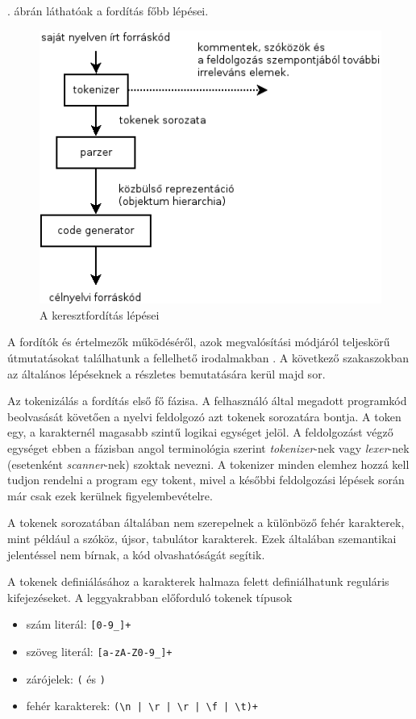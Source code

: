 . ábrán láthatóak a fordítás főbb lépései.
\begin{figure}
\centering
\includegraphics[scale=1]{kepek/process.png}
\caption{A keresztfordítás lépései}
\label{fig:process}
\end{figure}
A fordítók és értelmezők működéséről, azok megvalósítási módjáról teljeskörű útmutatásokat találhatunk a fellelhető irodalmakban \cite{compilers}.
A következő szakaszokban az általános lépéseknek a részletes bemutatására kerül majd sor.


Az tokenizálás a fordítás első fő fázisa. A felhasználó által megadott programkód beolvasását követően a nyelvi feldolgozó azt tokenek sorozatára bontja.
A token egy, a karakternél magasabb szintű logikai egységet jelöl.
A feldolgozást végző egységet ebben a fázisban angol terminológia szerint \textit{tokenizer}-nek vagy \textit{lexer}-nek (esetenként \textit{scanner}-nek) szoktak nevezni.
A tokenizer minden elemhez hozzá kell tudjon rendelni a program egy tokent, mivel a későbbi feldolgozási lépések során már csak ezek kerülnek figyelembevételre.

A tokenek sorozatában általában nem szerepelnek a különböző fehér karakterek, mint például a szóköz, újsor, tabulátor karakterek.
Ezek általában szemantikai jelentéssel nem bírnak, a kód olvashatóságát segítik.

A tokenek definiálásához a karakterek halmaza felett definiálhatunk reguláris kifejezéseket.
A leggyakrabban előforduló tokenek típusok
\begin{itemize}
\item szám literál: \texttt{[0-9\_]+}
\item szöveg literál: \texttt{[a-zA-Z0-9\_]+}
\item zárójelek: \texttt{(} és \texttt{)}
\item fehér karakterek: \verb$(\n | \r | \r | \f | \t)+$
\end{itemize}

